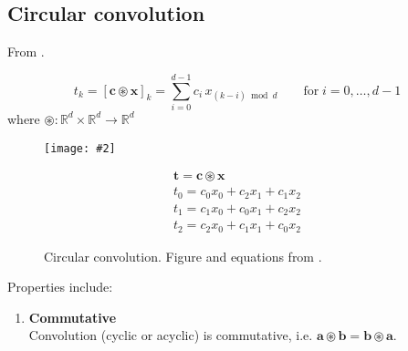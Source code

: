 \documentclass{article}
\makeatletter
\DeclareRobustCommand{\ie}{i.e.\@\xspace}
\newcommand{\gph}[2]{\texttt{[image: \#2]}}
\newcommand{\tbf}[1]{\textbf{#1}}
\makeatother
\begin{document}
\subsection{Circular convolution}
\label{subsec: Circular convolution}

From \cite{plate1995holographic,nickel2016holographic,dubois2017working}.

\begin{equation}
    t_k = \left[\mathbf{c} \circledast \mathbf{x}\right]_{k} = \sum_{i=0}^{d-1} c_{i} \, x_{(k-i) \bmod d} \qquad \text{for} \; i = 0, \dotsc, d-1
\end{equation}
\noindent
where $\circledast : \mathbb{R}^{d} \times \mathbb{R}^{d} \rightarrow \mathbb{R}^{d}$


\begin{figure}[h]
\begin{minipage}{0.5\linewidth}
    \begin{center}
    \gph{0.5}{images/circular_convolution.png}
    \end{center}
\end{minipage}
\begin{minipage}{0.5\linewidth}
    \begin{equation}
        \begin{array}{c}{\mathbf{t} = \mathbf{c} \circledast \mathbf{x}} \\ {t_{0}=c_{0} x_{0}+c_{2} x_{1}+c_{1} x_{2}} \\ {t_{1}=c_{1} x_{0}+c_{0} x_{1}+c_{2} x_{2}} \\ {t_{2}=c_{2} x_{0}+c_{1} x_{1}+c_{0} x_{2}}\end{array}
    \end{equation}
\end{minipage}
\caption{Circular convolution. Figure and equations from \cite{plate1995holographic}.}
\end{figure}

Properties include:

\begin{enumerate}[label=\roman*)]
    \item {\tbf{Commutative} \\
                Convolution (cyclic or acyclic) is commutative, \ie{} $\mathbf{a} \circledast \mathbf{b} = \mathbf{b} \circledast \mathbf{a}$.}
\end{enumerate}





\clearpage
\singlespacing


\end{document}
